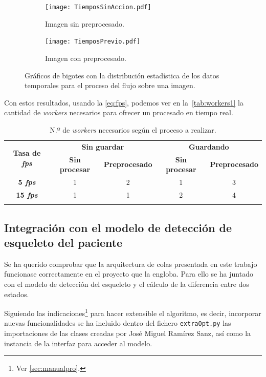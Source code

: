 \begin{figure}[h]
	\begin{subfigure}[b]{\textwidth}
		\texttt{[image: TiemposSinAccion.pdf]}
		\caption{Imagen sin preprocesado.}
	\end{subfigure}
	\begin{subfigure}[b]{\textwidth}
		\texttt{[image: TiemposPrevio.pdf]}
		\caption{Imagen con preprocesado.}
	\end{subfigure}
	\caption{Gráficos de bigotes con la distribución estadística de los datos temporales para el proceso del flujo sobre una imagen.}
	\label{fig:dist2}
\end{figure}

Con estos resultados, usando la \autoref{eq:fps}, podemos ver en la~\autoref{tab:workers1} la cantidad de \textit{workers} necesarios para ofrecer un procesado en tiempo real.

\begin{table}[h]
	\begin{center}
		\begin{tabular}{c  c c c c  }
			\toprule
			\multirow{2}{1.5cm}{\textbf{Tasa de \textit{fps}}}& \multicolumn{2}{c}{\textbf{Sin guardar}} & \multicolumn{2}{c}{\textbf{Guardando}}\\
			& \textbf{Sin procesar} & \textbf{Preprocesado} & \textbf{Sin procesar} & \textbf{Preprocesado}\\
			\otoprule
			\textbf{5 \textit{fps}} & 1 & 2 &1 & 3\\
			\textbf{15 \textit{fps}} & 1 & 1 &2 & 4\\
			\bottomruleS
		\end{tabular}
	\end{center}
	\caption{N.º de \textit{workers} necesarios según el proceso a realizar.}
	\label{tab:workers1}
\end{table}


\subsection{Integración con el modelo de detección de esqueleto del paciente}

Se ha querido comprobar que la arquitectura de colas presentada en este trabajo funcionase correctamente en el proyecto que la engloba. Para ello se ha juntado con el modelo de detección del esqueleto y el cálculo de la diferencia entre dos estados.

Siguiendo las indicaciones\footnote{Ver \autoref{sec:manualpro}.} para hacer extensible el algoritmo, es decir, incorporar nuevas funcionalidades se ha incluido dentro del fichero \texttt{extraOpt.py} las importaciones de las clases creadas por José Miguel Ramírez Sanz, así como la instancia de la interfaz para acceder al modelo.

